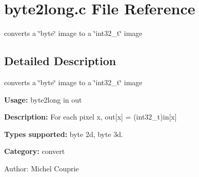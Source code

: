 \section{byte2long.c File Reference}
\label{byte2long_8c}
converts a \char`\"{}byte\char`\"{} image to a \char`\"{}int32\_\-t\char`\"{} image 



\subsection{Detailed Description}
converts a \char`\"{}byte\char`\"{} image to a \char`\"{}int32\_\-t\char`\"{} image 

{\bf Usage:} byte2long in out

{\bf Description:} For each pixel x, out[x] = (int32\_\-t)in[x]

{\bf Types supported:} byte 2d, byte 3d.

{\bf Category:} convert

\begin{Desc}
\item[Author:]Michel Couprie \end{Desc}

